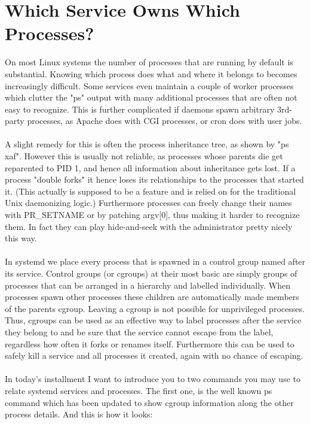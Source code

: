 \documentclass[titlepage]{article}
\begin{document}
\section{Which Service Owns Which Processes?}
On most Linux systems the number of processes that are running by default is substantial. Knowing which process does what and where it belongs to becomes increasingly difficult. Some services even maintain a couple of worker processes which clutter the "ps" output with many additional processes that are often not easy to recognize. This is further complicated if daemons spawn arbitrary 3rd-party processes, as Apache does with CGI processes, or cron does with user jobs.
\\
\\
A slight remedy for this is often the process inheritance tree, as shown by "ps xaf". However this is usually not reliable, as processes whose parents die get reparented to PID 1, and hence all information about inheritance gets lost. If a process "double forks" it hence loses its relationships to the processes that started it. (This actually is supposed to be a feature and is relied on for the traditional Unix daemonizing logic.) Furthermore processes can freely change their names with PR\_SETNAME or by patching argv[0], thus making it harder to recognize them. In fact they can play hide-and-seek with the administrator pretty nicely this way.
\\
\\
In systemd we place every process that is spawned in a control group named after its service. Control groups (or cgroups) at their most basic are simply groups of processes that can be arranged in a hierarchy and labelled individually. When processes spawn other processes these children are automatically made members of the parents cgroup. Leaving a cgroup is not possible for unprivileged processes. Thus, cgroups can be used as an effective way to label processes after the service they belong to and be sure that the service cannot escape from the label, regardless how often it forks or renames itself. Furthermore this can be used to safely kill a service and all processes it created, again with no chance of escaping.
\\
\\
In today's installment I want to introduce you to two commands you may use to relate systemd services and processes. The first one, is the well known ps command which has been updated to show cgroup information along the other process details. And this is how it looks:
\end{document}
